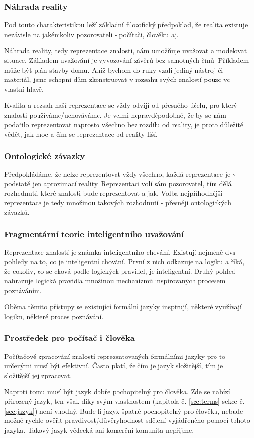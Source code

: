\subsubsection{Náhrada reality}
Pod touto charakteristikou leží základní filozofický předpoklad, že realita existuje nezávisle na jakémkoliv pozorovateli - počítači, člověku aj.\par
Náhrada reality, tedy reprezentace znalosti, nám umožňuje uvažovat a modelovat situace. Základem uvažování je vyvozování závěrů bez samotných činů. Příkladem může být plán stavby domu. Aniž bychom do ruky vzali jediný nástroj či materiál, jsme schopni dům zkonstruovat v rozsahu svých znalostí pouze ve vlastní hlavě.\par
Kvalita a rozsah naší reprezentace se vždy odvíjí od přesného účelu, pro který znalosti používáme/uchováváme. Je velmi nepravděpodobné, že by se nám podařilo reprezentovat naprosto všechno bez rozdílu od reality, je proto důležité vědět, jak moc a čím se reprezentace od reality liší.\cite{cite:10}
\subsubsection{Ontologické závazky} \label{ontological_commitments}
Předpokládáme, že nelze reprezentovat vždy všechno, každá reprezentace je v podstatě jen aproximací reality. Reprezentaci volí sám pozorovatel, tím dělá rozhodnutí, které znalosti bude reprezentovat a jak. Volba nejpříhodnější reprezentace je tedy množinou takových rozhodnutí - přesněji ontologických závazků.\cite{cite:09}
\subsubsection{Fragmentární teorie inteligentního uvažování}
Reprezentace znalostí je známka inteligentního chování. Existují nejméně dva pohledy na to, co je inteligentní chování. První z nich odkazuje na logiku a říká, že cokoliv, co se chová podle logických pravidel, je inteligentní. Druhý pohled nahrazuje logická pravidla množinou mechanizmů inspirovaných procesem poznáváním.\cite{cite:10} \par 
Oběma těmito přístupy se existující formální jazyky inspirují, některé využívají logiku, některé proces poznávání. \cite{cite:10}
\subsubsection{Prostředek pro počítač i člověka}
Počítačové zpracování znalostí reprezentovaných formálními jazyky pro to určenými musí být efektivní. Často platí, že čím je jazyk složitější, tím je složitější jej zpracovat.\cite{cite:10} \par 
Naproti tomu musí být jazyk dobře pochopitelný pro člověka. Zde se nabízí přirozený jazyk, ten však díky svým vlastnostem (kapitola č. \ref{sec:terms} sekce č. \ref{sec:jazyk}) není vhodný. Bude-li jazyk špatně pochopitelný pro člověka, nebude možné rychle ověřit pravdivost/důvěryhodnost sdělení vyjádřeného pomocí tohoto jazyka. Takový jazyk vědecká ani komerční komunita nepřijme. \cite{cite:10}

